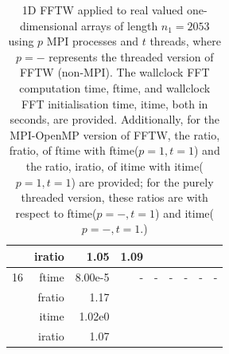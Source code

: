 \documentclass[a4]{article}
\begin{document}
\begin{table}
\begin{center}
\begin{tabular}{|r|r|r|r|r|r|r|r|r|}
      & iratio &  1.05 &   1.09   &  & & & & \\ \hline
    16 & ftime  &    8.00e-5  & - & - & - & - & - & - \\ 
     & fratio &     1.17   &  &  &  &  &  &  \\
      & itime & 1.02e0   & & & & & & \\
      & iratio & 1.07  & & & & & & \\ \hline
\end{tabular}
\caption{1D FFTW applied to real valued one-dimensional arrays of length $n_1=2053$ using $p$ MPI processes and $t$ threads, where $p=-$ represents the threaded version of FFTW (non-MPI). The wallclock FFT computation time, ftime, and wallclock FFT initialisation time, itime, both in seconds, are provided. Additionally, for the MPI-OpenMP version of FFTW, the ratio, fratio, of ftime  with ftime($p=1,t=1$) and the ratio, iratio, of itime  with itime($p=1,t=1$) are provided; for the purely threaded version, these ratios are with respect to ftime($p=-,t=1$) and itime($p=-,t=1$.) }\label{Tbl:FFT1d2053}
\end{center}
\end{table}
\end{document}
